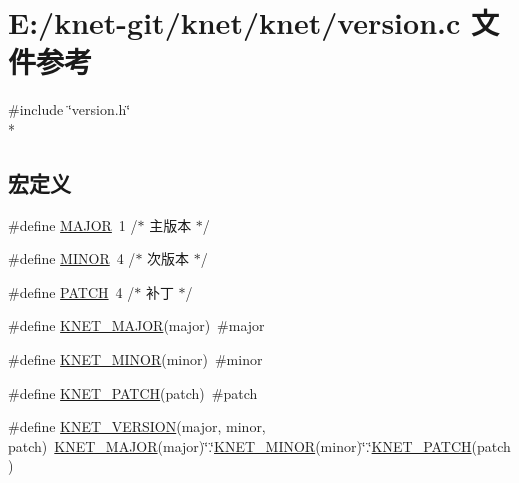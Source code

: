 \hypertarget{a00088}{}\section{E\+:/knet-\/git/knet/knet/version.c 文件参考}
\label{a00088}
{\ttfamily \#include \char`\"{}version.\+h\char`\"{}}\\*
\subsection*{宏定义}
\begin{DoxyCompactItemize}
\item 
\#define \hyperlink{a00088_a877cce34f3e58fd7f9194fab90724cb8_a877cce34f3e58fd7f9194fab90724cb8}{M\+A\+J\+O\+R}~1 /$\ast$ 主版本 $\ast$/
\item 
\#define \hyperlink{a00088_a4e10915d93013542d442d78de0e02e9a_a4e10915d93013542d442d78de0e02e9a}{M\+I\+N\+O\+R}~4 /$\ast$ 次版本 $\ast$/
\item 
\#define \hyperlink{a00088_af59c44c1f3ff875c35393428624473aa_af59c44c1f3ff875c35393428624473aa}{P\+A\+T\+C\+H}~4 /$\ast$ 补丁 $\ast$/
\item 
\#define \hyperlink{a00088_ad4c134c968cc4fc0cc700567eb39c675_ad4c134c968cc4fc0cc700567eb39c675}{K\+N\+E\+T\+\_\+\+M\+A\+J\+O\+R}(major)~\#major
\item 
\#define \hyperlink{a00088_a70224fafcaea5102f9cd726ba926684f_a70224fafcaea5102f9cd726ba926684f}{K\+N\+E\+T\+\_\+\+M\+I\+N\+O\+R}(minor)~\#minor
\item 
\#define \hyperlink{a00088_ae9af7a95a483a187a37d3e9828c6ac1c_ae9af7a95a483a187a37d3e9828c6ac1c}{K\+N\+E\+T\+\_\+\+P\+A\+T\+C\+H}(patch)~\#patch
\item 
\#define \hyperlink{a00088_a96eb274e34ccfa0c0505ca99f2e09a82_a96eb274e34ccfa0c0505ca99f2e09a82}{K\+N\+E\+T\+\_\+\+V\+E\+R\+S\+I\+O\+N}(major,  minor,  patch)~\hyperlink{a00088_ad4c134c968cc4fc0cc700567eb39c675_ad4c134c968cc4fc0cc700567eb39c675}{K\+N\+E\+T\+\_\+\+M\+A\+J\+O\+R}(major)\char`\"{}.\char`\"{}\hyperlink{a00088_a70224fafcaea5102f9cd726ba926684f_a70224fafcaea5102f9cd726ba926684f}{K\+N\+E\+T\+\_\+\+M\+I\+N\+O\+R}(minor)\char`\"{}.\char`\"{}\hyperlink{a00088_ae9af7a95a483a187a37d3e9828c6ac1c_ae9af7a95a483a187a37d3e9828c6ac1c}{K\+N\+E\+T\+\_\+\+P\+A\+T\+C\+H}(patch)
\end{DoxyCompactItemize}
